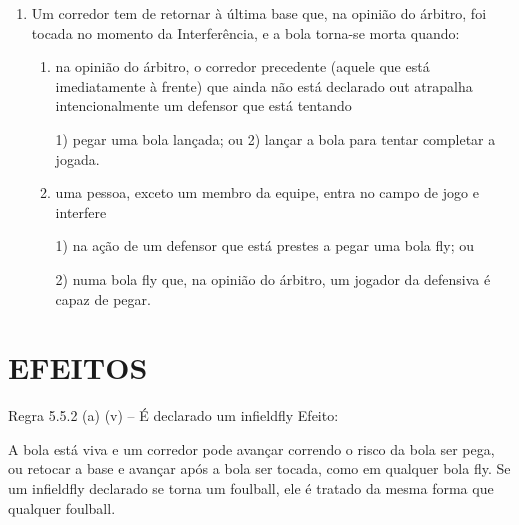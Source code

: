 \begin{enumerate}[label=(\alph*)]
\begin{enumerate}[label=\roman*.]
	\item   Um \gls{bunt}  executado depois do segundo \gls{strike} resulta em \gls{foulball}, exceto se um corredor atrapalha um defensor que está tentando pegar uma bola \gls{fly} resultante de \gls{bunt}  em território \gls{foul}, ou interfere numa bola \gls{foul fly} que um  defensor está tentando pegar; nesse caso, o batedor-corredor volta a bater, com um \gls{strike} adicional pela bola \gls{foul} se a contagem de bolas era menos de dois  \glspl{strike} quando ele bateu a bola. Se um \gls{fly} resultante de \gls{bunt}  for pego, a bola  continuará viva e em jogo.
\end{enumerate}

		\item  Um corredor tem de retornar à última base que, na opinião do árbitro, foi tocada no momento da Interferência, e a bola torna-se morta quando:

		\begin{enumerate}[label=\roman*.]
			\item na opinião do árbitro, o corredor precedente (aquele que está imediatamente à frente) que ainda não está declarado \gls{out} atrapalha  intencionalmente um defensor que está tentando

				 1) pegar uma bola lançada; ou
				 2) lançar a bola para tentar completar a jogada.

			\item  uma pessoa, exceto um membro da equipe, entra no campo de jogo e interfere

				1) na ação de um defensor que está prestes a pegar uma bola \gls{fly}; ou

				2) numa bola \gls{fly} que, na opinião do árbitro, um jogador da defensiva é capaz de pegar.
		\end{enumerate}
	\end{enumerate}
\section*{EFEITOS}

 Regra 5.5.2 (a) (v) -- É declarado um \gls{infieldfly}
 Efeito:

 A bola está viva e um corredor pode avançar correndo o risco da bola ser pega, ou retocar a base e avançar após a bola ser tocada, como em qualquer bola \gls{fly}. Se um \gls{infieldfly} declarado se torna um \gls{foulball}, ele é tratado da mesma forma que qualquer \gls{foulball}.


